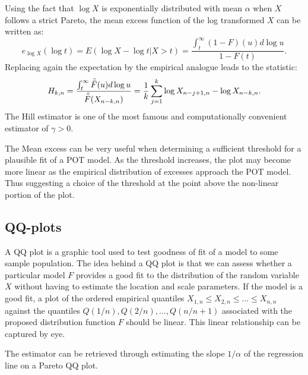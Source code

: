 Using the fact that $\log X$ is exponentially distributed with mean $\alpha$ when $X$ follows a strict Pareto, the mean excess function of the log transformed $X$ can be written as:
\begin{equation}
e_{\log X}(\log t)= E(\log X-\log t|X>t) = \dfrac{\int^{\infty}_t (1-F)(u)d\log u}{1-F(t)}.
\end{equation}Replacing again the expectation by the empirical analogue leads to the \cite{hill1975simple} statistic:
\begin{equation}
H_{k,n}=\dfrac{\int^{\infty}_t \hat{\Bar{F}}(u)d \log u}{\hat{\Bar{F}}(X_{n-k,n})} = \dfrac{1}{k}\sum_{j=1}^{k} \log X_{n-j+1,n}- \log X_{n-k,n}.
\end{equation}The Hill estimator is one of the most famous and computationally convenient estimator of $\gamma>0$.

The Mean excess can be very useful when determining a sufficient threshold for a plausible fit of a POT model. As the threshold increases, the plot may become more linear as the empirical distribution of excesses approach the POT model. Thus suggesting a choice of the threshold at the point above the non-linear portion of the plot.

\subsection{QQ-plots}\label{qq}
A QQ plot is a graphic tool used to test goodness of fit of a model to some sample population. The idea behind a QQ plot is that we can assess whether a particular model $F$ provides a good fit to the distribution of the random variable $X$ without having to estimate the location and scale parameters. If the model is a good fit, a plot of the ordered empirical quantiles $X_{1,n}\leq X_{2,n}\leq ...\leq X_{n,n}$ against the quantiles $Q(1/n),  Q(2/n),..., Q(n/n+1)$ associated with the proposed distribution function $F$ should be linear. This linear relationship can be captured by eye.

The \cite{hill1975simple} estimator can be retrieved through estimating the slope $1/\alpha$ of the regression line on a Pareto QQ plot.


